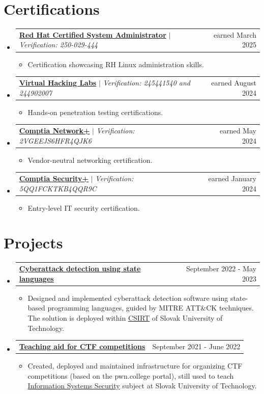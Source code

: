 \documentclass[letterpaper,11pt]{article}
\makeatletter
\newcommand{\resumeItem}[1]{
  \item\small{
    {#1 \vspace{-2pt}}
  }
}
\newcommand{\resumeProjectHeading}[2]{
    \item
    \begin{tabular*}{0.97\textwidth}{l@{\extracolsep{\fill}}r}
      \small#1 & #2 \\
    \end{tabular*}\vspace{-7pt}
}
\newcommand{\resumeSubHeadingListStart}{\begin{itemize}[leftmargin=0.15in, label={}]}
\newcommand{\resumeSubHeadingListEnd}{\end{itemize}}
\newcommand{\resumeItemListStart}{\begin{itemize}}
\newcommand{\resumeItemListEnd}{\end{itemize}\vspace{-5pt}}
\makeatother
\begin{document}
\section{Certifications}
    \resumeSubHeadingListStart
      \resumeProjectHeading
          {\textbf{\href{https://drive.proton.me/urls/K3QKHE62EM\#60PmC5oL7gQH}{Red Hat Certified System Administrator}} $|$ \emph{Verification: 250-029-444} }{earned March 2025}
          \resumeItemListStart
            \resumeItem{Certification showcasing RH Linux administration skills.}
          \resumeItemListEnd
      \resumeProjectHeading
          {\textbf{\href{https://drive.proton.me/urls/WQCXTSR8C0\#8HdkpbN5AP9T}{Virtual Hacking Labs}} $|$ \emph{Verification: 245441540 and 244902007} }{earned August 2024}
          \resumeItemListStart
            \resumeItem{Hands-on penetration testing certifications.}
          \resumeItemListEnd
    \resumeProjectHeading
          {\textbf{\href{https://drive.proton.me/urls/0MFCTG9R1W\#d9Em1lgeyORn}{Comptia Network+}} $|$ \emph{Verification: 2VGEEJS6HFR4QJK6} }{earned May 2024}
          \resumeItemListStart
            \resumeItem{Vendor-neutral networking certification.}
          \resumeItemListEnd
    \resumeProjectHeading
          {\textbf{\href{https://drive.proton.me/urls/TRGRCY96SR\#3wtGCbwKKhTa}{Comptia Security+}} $|$ \emph{Verification: 5QQ1FCKTKB4QQR9C} }{earned January 2024}
          \resumeItemListStart
            \resumeItem{Entry-level IT security certification.}
          \resumeItemListEnd
    \resumeSubHeadingListEnd



\section{Projects}
    \resumeSubHeadingListStart
      \resumeProjectHeading
          {\textbf{\href{https://opac.crzp.sk/?fn=detailBiblioForm\&sid=C0DEB8E07572332BAD240C15805F}{Cyberattack detection using state languages}} }{September 2022 - May 2023}
          \resumeItemListStart
            \resumeItem{Designed and implemented cyberattack detection software using state-based programming languages, guided by MITRE ATT\&CK techniques. The solution is deployed within \href{https://csirt.fei.stuba.sk/en/}{CSIRT} of Slovak University of Technology.}
          \resumeItemListEnd
      \resumeProjectHeading
          {\textbf{\href{https://feictf.xyz/}{Teaching aid for CTF competitions}} }{September 2021 - June 2022}
          \resumeItemListStart
            \resumeItem{Created, deployed and maintained infrastructure for organizing CTF competitions (based on the pwn.college portal), still used to teach \href{https://uim.fei.stuba.sk/predmet/i-bispp/}{Information Systems Security} subject at Slovak University of Technology.}
          \resumeItemListEnd
    \resumeSubHeadingListEnd
\end{document}
